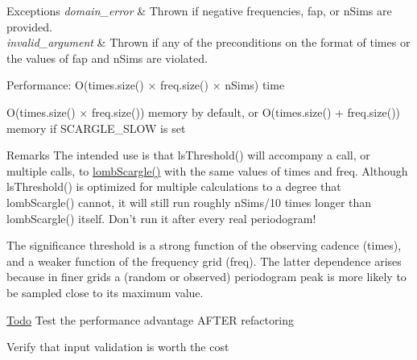 \begin{DoxyExceptions}{Exceptions}
{\em domain\_\-error} & Thrown if negative frequencies, fap, or nSims are provided. \\
\hline
{\em invalid\_\-argument} & Thrown if any of the preconditions on the format of times or the values of fap and nSims are violated.\\
\hline
\end{DoxyExceptions}
\begin{DoxyParagraph}{Performance:}
O(times.size() × freq.size() × nSims) time 
\end{DoxyParagraph}
\begin{DoxyParagraph}{}
O(times.size() × freq.size()) memory by default, or O(times.size() + freq.size()) memory if SCARGLE\_\-SLOW is set
\end{DoxyParagraph}
\begin{DoxyRemark}{Remarks}
The intended use is that lsThreshold() will accompany a call, or multiple calls, to \hyperlink{group__period_ga2c64d467f67fa7f90f96617275e057a7}{lombScargle()} with the same values of times and freq. Although lsThreshold() is optimized for multiple calculations to a degree that lombScargle() cannot, it will still run roughly nSims/10 times longer than lombScargle() itself. Don't run it after every real periodogram!

The significance threshold is a strong function of the observing cadence (times), and a weaker function of the frequency grid (freq). The latter dependence arises because in finer grids a (random or observed) periodogram peak is more likely to be sampled close to its maximum value.
\end{DoxyRemark}
\begin{Desc}
\item[\hyperlink{todo__todo000008}{Todo}]Test the performance advantage AFTER refactoring 

Verify that input validation is worth the cost \end{Desc}
